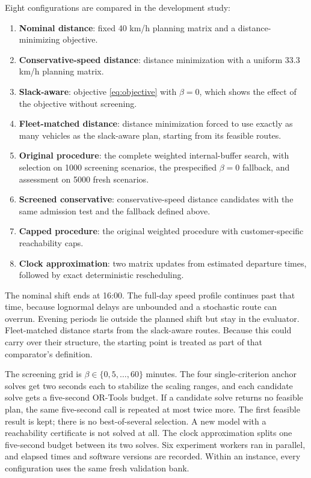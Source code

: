 \documentclass[11pt,a4paper]{article}
\begin{document}
Eight configurations are compared in the development study:
\begin{enumerate}
  \item \textbf{Nominal distance}: fixed 40 km/h planning matrix and a
        distance-minimizing objective.
  \item \textbf{Conservative-speed distance}: distance minimization with a
        uniform 33.3 km/h planning matrix.
  \item \textbf{Slack-aware}: objective \eqref{eq:objective} with $\beta=0$,
        which shows the effect of the objective without screening.
  \item \textbf{Fleet-matched distance}: distance minimization forced to use
        exactly as many vehicles as the slack-aware plan, starting from its
        feasible routes.
  \item \textbf{Original procedure}: the complete weighted internal-buffer search, with
        selection on 1000 screening scenarios, the prespecified $\beta=0$
        fallback, and assessment on 5000 fresh scenarios.
  \item \textbf{Screened conservative}: conservative-speed distance candidates
        with the same admission test and the fallback defined above.
  \item \textbf{Capped procedure}: the original weighted procedure with
        customer-specific reachability caps.
  \item \textbf{Clock approximation}: two matrix updates from estimated
        departure times, followed by exact deterministic rescheduling.
\end{enumerate}

The nominal shift ends at 16:00. The full-day speed profile continues past
that time, because lognormal delays are unbounded and a stochastic route can
overrun. Evening periods lie outside the planned shift but stay in the evaluator.
Fleet-matched distance starts from the slack-aware routes. Because this could
carry over their structure, the starting point is treated as part of that
comparator's definition.

The screening grid is $\beta\in\{0,5,\ldots,60\}$ minutes. The four
single-criterion anchor solves get two seconds each to stabilize the scaling
ranges, and each candidate solve gets a five-second OR-Tools budget. If a
candidate solve returns no feasible plan, the same five-second call is repeated
at most twice more. The first feasible result is kept; there is no best-of-several
selection. A new model with a reachability certificate is not solved at all. The
clock approximation splits one five-second budget between its two solves. Six
experiment workers ran in parallel, and elapsed times and software versions are
recorded. Within an instance, every configuration uses the same fresh validation
bank.
\end{document}
